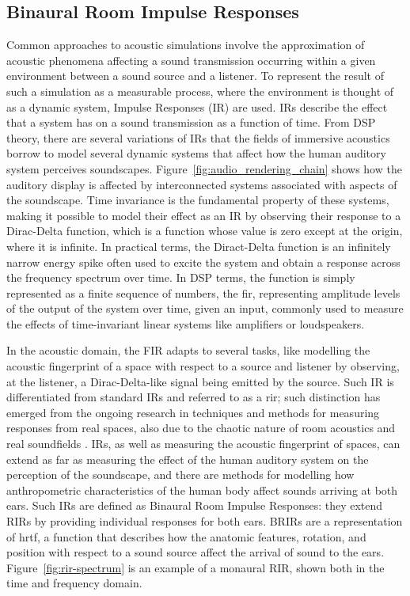 \subsection{Binaural Room Impulse Responses}\label{sec:ir-definition}
Common approaches to acoustic simulations involve the approximation of acoustic phenomena affecting a sound transmission occurring within a given environment between a sound source and a listener. To represent the result of such a simulation as a measurable process, where the environment is thought of as a dynamic system, Impulse Responses (IR) are used. IRs describe the effect that a system has on a sound transmission as a function of time. From DSP theory, there are several variations of IRs that the fields of immersive acoustics borrow to model several dynamic systems that affect how the human auditory system perceives soundscapes. Figure~\ref{fig:audio_rendering_chain} shows how the auditory display is affected by interconnected systems associated with aspects of the soundscape. Time invariance is the fundamental property of these systems, making it possible to model their effect as an IR by observing their response to a Dirac-Delta function, which is a function whose value is zero except at the origin, where it is infinite. In practical terms, the Diract-Delta function is an infinitely narrow energy spike often used to excite the system and obtain a response across the frequency spectrum over time. In DSP terms, the function is simply represented as a finite sequence of numbers, the \acrfull{fir}, representing amplitude levels of the output of the system over time, given an input, commonly used to measure the effects of time-invariant linear systems like amplifiers or loudspeakers.\par
In the acoustic domain, the FIR adapts to several tasks, like modelling the acoustic fingerprint of a space with respect to a source and listener by observing, at the listener, a Dirac-Delta-like signal being emitted by the source. Such IR is differentiated from standard IRs and referred to as a \acrfull{rir}; such distinction has emerged from the ongoing research in techniques and methods for measuring responses from real spaces, also due to the chaotic nature of room acoustics and real soundfields \citep{farina07}. 
IRs, as well as measuring the acoustic fingerprint of spaces, can extend as far as measuring the effect of the human auditory system on the perception of the soundscape, and there are methods for modelling how anthropometric characteristics of the human body affect sounds arriving at both ears. Such IRs are defined as Binaural Room Impulse Responses: they extend RIRs by providing individual responses for both ears. BRIRs are a representation of \acrshort{hrtf}, a function that describes how the anatomic features, rotation, and position with respect to a sound source affect the arrival of sound to the ears. Figure~\ref{fig:rir-spectrum} is an example of a monaural RIR, shown both in the time and frequency domain. 
